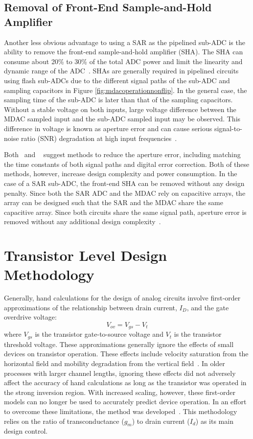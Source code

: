 \subsection{Removal of Front-End Sample-and-Hold Amplifier}
Another less obvious advantage to using a SAR as the pipelined sub-ADC is the ability to remove the front-end sample-and-hold amplifier (SHA). The SHA can consume about 20\% to 30\% of the total ADC power and limit the 
linearity and dynamic range of the ADC~\cite{4684625}. SHAs are generally required in pipelined circuits using flash sub-ADCs due to the different signal paths of the sub-ADC and sampling capacitors in Figure \ref{fig:mdacoperationnonflip}. In the general case, the sampling time of the sub-ADC is later than that of the sampling capacitors. Without a stable voltage on both inputs, large voltage difference 
between the MDAC sampled input and the sub-ADC sampled input may be observed. This difference in voltage is known as aperture error and can cause serious signal-to-noise ratio (SNR) degradation at high input frequencies~\cite{1356143}. 

Both~\cite{1356143} and \!~\cite{972143} suggest methods to reduce the aperture error, including matching the time constants of both signal paths and digital error correction. Both of these methods, however, increase design 
complexity and power consumption. In the case of a SAR sub-ADC, the front-end SHA can be removed without any design penalty. Since both the SAR ADC and the MDAC rely on capacitive arrays, the array can be designed such that 
the SAR and the MDAC share the same capacitive array. Since both circuits share the same signal path, aperture error is removed without any additional design complexity~\cite{5714725}.
\section{Transistor Level Design Methodology}
\label{sec:gmid}
Generally, hand calculations for the design of analog circuits involve first-order approximations of the relationship between drain current, $I_{D}$, and the gate overdrive voltage: 
\begin{equation}
\label{eq:vov}
V_{ov} = V_{gs}-V_{t}
\end{equation}
where $V_{gs}$ is the transistor gate-to-source voltage and $V_{t}$ is the transistor threshold voltage. These approximations generally ignore the effects of small devices on transistor operation. These effects include velocity saturation from the horizontal field and mobility degradation from the vertical field~\cite{bok:gray}. In older processes with larger channel lengths, ignoring these effects did not adversely affect the accuracy of hand calculations as long as the transistor was operated in the strong inversion region. With increased scaling, however, these first-order models can no longer be used to accurately predict device operation. In an effort to overcome these limitations, the \gmid\spc method was developed~\cite{535416}. This methodology relies on the ratio of transconductance ($g_{m}$) to drain current ($I_{d}$) as its main design control. 


